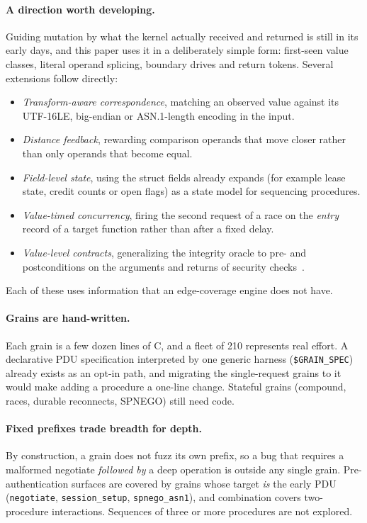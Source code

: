 \documentclass{article}
\begin{document}
\paragraph{A direction worth developing.} Guiding mutation by what the kernel
actually received and returned is still in its early days, and this paper uses
it in a deliberately simple form: first-seen value classes, literal operand
splicing, boundary drives and return tokens. Several extensions follow
directly:
\begin{itemize}[nosep]
  \item \emph{Transform-aware correspondence}, matching an observed value
        against its UTF-16LE, big-endian or ASN.1-length encoding in the
        input.
  \item \emph{Distance feedback}, rewarding comparison operands that move
        closer rather than only operands that become equal.
  \item \emph{Field-level state}, using the struct fields \kcovdf already
        expands (for example lease state, credit counts or open flags) as a
        state model for sequencing procedures.
  \item \emph{Value-timed concurrency}, firing the second request of a race
        on the \emph{entry} record of a target function rather than after a
        fixed delay.
  \item \emph{Value-level contracts}, generalizing the integrity oracle to
        pre- and postconditions on the arguments and returns of security
        checks~\cite{kim2026kcovdataflow}.
\end{itemize}
Each of these uses information that an edge-coverage engine does not have.

\paragraph{Grains are hand-written.} Each grain is a few dozen lines of C, and
a fleet of 210 represents real effort. A declarative PDU specification
interpreted by one generic harness (\texttt{\$GRAIN\_SPEC}) already exists as
an opt-in path, and migrating the single-request grains to it would make
adding a procedure a one-line change. Stateful grains (compound, races,
durable reconnects, SPNEGO) still need code.

\paragraph{Fixed prefixes trade breadth for depth.} By construction, a grain
does not fuzz its own prefix, so a bug that requires a malformed negotiate
\emph{followed by} a deep operation is outside any single grain.
Pre-authentication surfaces are covered by grains whose target \emph{is} the
early PDU (\texttt{negotiate}, \texttt{session\_setup}, \texttt{spnego\_asn1}),
and combination covers two-procedure interactions. Sequences of three or more
procedures are not explored.
\end{document}
